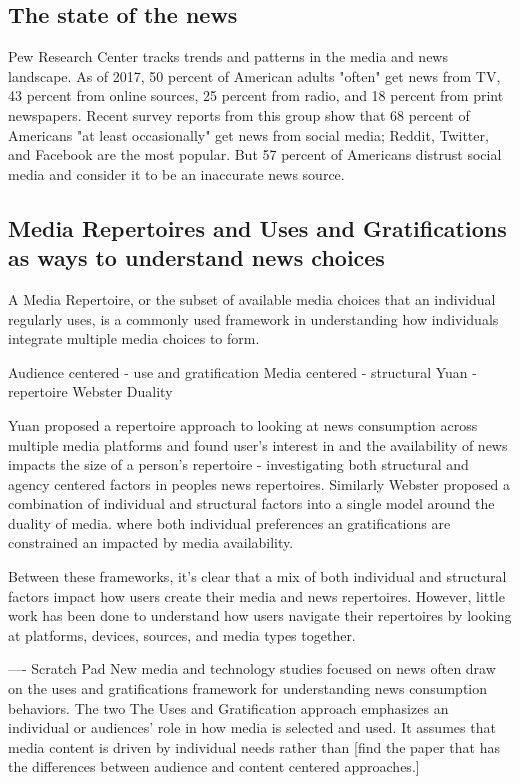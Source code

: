 \documentclass[sigchi]{acmart}
\begin{document}
\subsection{The state of the news}
Pew Research Center tracks trends and patterns in the media and news landscape. As of 2017, 50 percent of American adults "often" get news from TV, 43 percent from online sources, 25 percent from radio, and 18 percent from print newspapers. \cite{pew_TVonline} Recent survey reports from this group show that 68 percent of Americans "at least occasionally" get news from social media; Reddit, Twitter, and Facebook are the most popular. But 57 percent of Americans distrust social media and consider it to be an inaccurate news source. \cite{pew_newsusesocial2018}

\subsection{Media Repertoires and Uses and Gratifications as ways to understand news choices}
A Media Repertoire, or the subset of available media choices that an individual regularly uses, is a commonly used framework in understanding how individuals integrate multiple media choices to form. 

Audience centered - use and gratification
Media centered - structural
Yuan - repertoire 
Webster Duality 

Yuan \cite{yuan2011news} proposed a repertoire approach to looking at news consumption across multiple media platforms and found user's interest in and the availability of news impacts the size of a person's repertoire - investigating both structural and agency centered factors in peoples news repertoires. 
Similarly Webster \cite{webster2011duality} proposed a combination of individual and structural factors into a single model around the duality of media. where both individual preferences an gratifications are constrained an impacted by media availability. 

Between these frameworks, it's clear that a mix of both individual and structural factors impact how users create their media and news repertoires. However, little work has been done to understand how users navigate their repertoires by looking at platforms, devices, sources, and media types together. 



----
Scratch Pad
New media and technology studies focused on news often draw on the uses and gratifications framework for understanding news consumption behaviors. The two  The Uses and Gratification approach emphasizes an individual or audiences' role in how media is selected and used. It assumes that media content is driven by individual needs rather than [find the paper that has the differences between audience and content centered approaches.]
\end{document}
